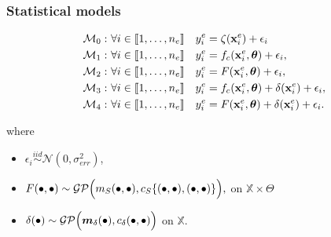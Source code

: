 \documentclass[nopagenumber,9pt]{beamer}
\begin{document}
\begin{frame}
 \frametitle{Statistical models}
 
 
 \begin{align*}
\mathcal{M}_0 : & \ \forall i \in \llbracket1,\dots,n_e\rrbracket \quad y^{e}_i=\zeta(\mathbf{x}^e_i)+\epsilon_i\\
\mathcal{M}_1 :& \ \forall i \in \llbracket1,\dots,n_e\rrbracket \quad  y^{e}_i=f_c(\mathbf{x}^e_i,\boldsymbol{\theta})+\epsilon_i,\\
\mathcal{M}_2  :& \ \forall i \in \llbracket1,\dots,n_e\rrbracket \quad y^{e}_i = F(\mathbf{x}^e_i,\boldsymbol{\theta}) + \epsilon_i,\\
\mathcal{M}_3  :&  \ \forall i \in \llbracket1,\dots,n_e\rrbracket \quad y^{e}_i= f_c(\mathbf{x}^e_i,\boldsymbol{\theta})+\delta(\mathbf{x}^e_i)+\epsilon_i,\\
\mathcal{M}_4  : &\ \forall i \in \llbracket1,\dots,n_e\rrbracket \quad y^{e}_i= F(\mathbf{x}^e_i,\boldsymbol{\theta})+\delta(\mathbf{x}^e_i)+\epsilon_i.
\end{align*}

where 
\begin{itemize}
 \item $\epsilon_i\overset{iid}{\sim} \mathcal{N}(0,\sigma_{err}^2)$,
 \item $F(\bullet,\bullet)  \sim{\mathcal{GP}}{\Big(m_S(\bullet,\bullet),c_S\{(\bullet,\bullet),(\bullet,\bullet)\}\Big)},$ on $\mathbb{X}\times \Theta$
 \item 
$\delta(\bullet)  \sim {\mathcal{GP}}{\Big(\boldsymbol{m}_{\delta}(\bullet),c_{\delta}(\bullet,\bullet)\Big)}$ on $\mathbb{X}$.
\end{itemize}

 \cite{carmassi2019bayesian}
 
\end{frame}
\end{document}
